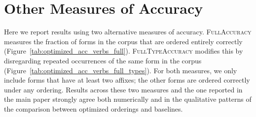 \documentclass[11pt,letterpaper]{article}
\begin{document}
\section{Other Measures of Accuracy}

Here we report results using two alternative measures of accuracy.
\textsc{FullAccuracy} measures the fraction of forms in the corpus that are ordered entirely correctly (Figure~\ref{tab:optimized_acc_verbs_full}).
\textsc{FullTypeAccuracy} modifies this by disregarding repeated occurrences of the same form in the corpus (Figure~\ref{tab:optimized_acc_verbs_full_types}).
For both measures, we only include forms that have at least two affixes; the other forms are ordered correctly under any ordering.
Results across these two measures and the one reported in the main paper strongly agree both numerically and in the qualitative patterns of the comparison between optimized orderings and baselines.
\end{document}
